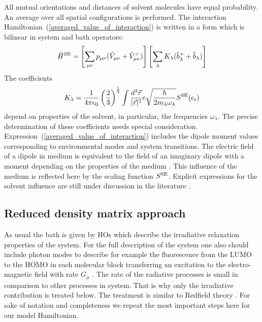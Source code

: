 \documentclass[12pt,twoside,a4paper]{report}
\begin{document}
All mutual orientations and distances  of  solvent molecules have  
equal probability.
An average over all spatial configurations is performed.
The interaction Hamiltonian~(\ref{averaged_value_of_interaction})
is written in a form which is bilinear in system and bath operators:
\begin{eqnarray}
\hat H^{\rm SE}
      =  \left[
            \sum_{\mu{}\nu} 
               p_{\mu{}\nu} 
               (\hat V_{\mu{}\nu} +\hat V^+_{\mu{}\nu} )
         \right]
         \left[
            \sum_\lambda 
               K_\lambda 
               (\hat b^+_\lambda + \hat b_\lambda)
         \right]
\label{phase}
\end{eqnarray}
The coefficients 
\begin{eqnarray}
K_\lambda
 =  \frac{1}
         {4\pi\epsilon_0}
    \left(
         \frac{2}{3}
    \right)^\frac{1}{2}
    \int
       \frac{d^3 \vec r}
            {|\vec r|^3}
       e\sqrt{\frac{\hbar}
                   {2m_\lambda\omega_\lambda}}
       S^{\rm SE}(\epsilon_{\rm s})
\end{eqnarray}
depend on properties of the solvent,
in particular, 
the frequencies $\omega_\lambda$.
The precise determination of these coefficients needs
special consideration.
Expression~(\ref{averaged_value_of_interaction})
includes the dipole moment values corresponding
to environmental modes  and system transitions. 
The electric field of a dipole in medium
is equivalent to the field of an imaginary dipole with a moment depending on
the properties of the medium \cite{Boettcher}.
This influence of the medium is reflected here by the scaling function $S^{\rm SE}$.
Explicit expressions for the solvent influence 
are still under discussion in the literature \cite{Georgievski,chri99}.





 
\subsection{Reduced density matrix approach\label{chem-RDM}}
As usual the bath is given by HOs
which describe
the irradiative relaxation properties of the system.
For the full description of the system one also should
include photon modes to describe for example
the fluorescence
from the LUMO to the HOMO in each molecular block 
transferring an excitation to
the electro-magnetic field with rate $G_\mu$ \cite{l4}. 
The rate of the radiative processes
is small in comparison to other processes in system.  That is why only
the irradiative contribution is treated below.  The treatment is
similar to Redfield theory \cite{redf55}. For sake of notation and completeness we
repeat the most important steps here for our model Hamiltonian.
\end{document}
